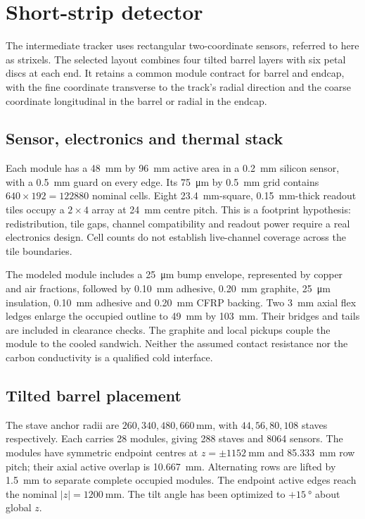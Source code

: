 \section{Short-strip detector}
\label{sec:short-strips}
The intermediate tracker uses rectangular two-coordinate sensors, referred to
here as strixels. The selected layout combines four tilted barrel layers with
six petal discs at each end. It retains a common module contract for barrel and
endcap, with the fine coordinate transverse to the track's radial direction and
the coarse coordinate longitudinal in the barrel or radial in the endcap.

\subsection{Sensor, electronics and thermal stack}
Each module has a \qty{48}{\milli\metre} by \qty{96}{\milli\metre} active area
in a \qty{0.2}{\milli\metre} silicon sensor, with a \qty{0.5}{\milli\metre}
guard on every edge. Its \qty{75}{\micro\metre} by \qty{0.5}{\milli\metre}
grid contains $640\times192=\num{122880}$ nominal cells. Eight
\qty{23.4}{\milli\metre}-square, \qty{0.15}{\milli\metre}-thick readout tiles
occupy a $2\times4$ array at \qty{24}{\milli\metre} centre pitch. This is a
footprint hypothesis: redistribution, tile gaps, channel compatibility and
readout power require a real electronics design. Cell counts do not establish
live-channel coverage across the tile boundaries.

The modeled module includes a \qty{25}{\micro\metre} bump envelope, represented
by copper and air fractions, followed by \qty{0.10}{\milli\metre} adhesive,
\qty{0.20}{\milli\metre} graphite, \qty{25}{\micro\metre} insulation,
\qty{0.10}{\milli\metre} adhesive and \qty{0.20}{\milli\metre} CFRP backing.
Two \qty{3}{\milli\metre} axial flex ledges enlarge the occupied outline to
\qty{49}{\milli\metre} by \qty{103}{\milli\metre}. Their bridges and tails are
included in clearance checks. The graphite and local pickups couple the module
to the cooled sandwich. Neither the assumed contact resistance nor the carbon
conductivity is a qualified cold interface.

\subsection{Tilted barrel placement}
The stave anchor radii are $260,340,480,660\,\unit{\milli\metre}$, with
$44,56,80,108$ staves respectively. Each carries 28 modules, giving 288 staves
and \num{8064} sensors. The modules have symmetric endpoint centres at
$z=\pm\qty{1152}{\milli\metre}$ and \qty{85.333}{\milli\metre} row pitch;
their axial active overlap is \qty{10.667}{\milli\metre}. Alternating rows
are lifted by \qty{1.5}{\milli\metre} to separate complete occupied modules.
The endpoint active edges reach the nominal $|z|=\qty{1200}{\milli\metre}$.
The tilt angle has been optimized to $+\qty{15}{\degree}$ about global $z$.

